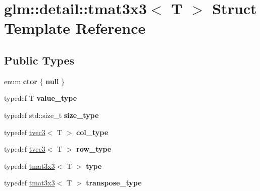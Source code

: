 \hypertarget{structglm_1_1detail_1_1tmat3x3}{}\section{glm\+:\+:detail\+:\+:tmat3x3$<$ T $>$ Struct Template Reference}
\label{structglm_1_1detail_1_1tmat3x3}
\subsection*{Public Types}
\begin{DoxyCompactItemize}
\item 
\hypertarget{structglm_1_1detail_1_1tmat3x3_a24175afa829b47d3cc2a65860b16e103}{}enum {\bfseries ctor} \{ {\bfseries null}
 \}\label{structglm_1_1detail_1_1tmat3x3_a24175afa829b47d3cc2a65860b16e103}

\item 
\hypertarget{structglm_1_1detail_1_1tmat3x3_aab4f85e201efbee89e6da484930a2dc8}{}typedef T {\bfseries value\+\_\+type}\label{structglm_1_1detail_1_1tmat3x3_aab4f85e201efbee89e6da484930a2dc8}

\item 
\hypertarget{structglm_1_1detail_1_1tmat3x3_aba8dbcfaebb2bff81e45ec6a5b405629}{}typedef std\+::size\+\_\+t {\bfseries size\+\_\+type}\label{structglm_1_1detail_1_1tmat3x3_aba8dbcfaebb2bff81e45ec6a5b405629}

\item 
\hypertarget{structglm_1_1detail_1_1tmat3x3_ad0e2472707a4ef5ebdb99d01f265cfd5}{}typedef \hyperlink{structglm_1_1detail_1_1tvec3}{tvec3}$<$ T $>$ {\bfseries col\+\_\+type}\label{structglm_1_1detail_1_1tmat3x3_ad0e2472707a4ef5ebdb99d01f265cfd5}

\item 
\hypertarget{structglm_1_1detail_1_1tmat3x3_a6d6d712e55dac6fa3660ea23923ed62e}{}typedef \hyperlink{structglm_1_1detail_1_1tvec3}{tvec3}$<$ T $>$ {\bfseries row\+\_\+type}\label{structglm_1_1detail_1_1tmat3x3_a6d6d712e55dac6fa3660ea23923ed62e}

\item 
\hypertarget{structglm_1_1detail_1_1tmat3x3_a16d3ade773d7ecdee78f54f9c8b355fd}{}typedef \hyperlink{structglm_1_1detail_1_1tmat3x3}{tmat3x3}$<$ T $>$ {\bfseries type}\label{structglm_1_1detail_1_1tmat3x3_a16d3ade773d7ecdee78f54f9c8b355fd}

\item 
\hypertarget{structglm_1_1detail_1_1tmat3x3_a8297942592cc441994c1a8b55119d6a7}{}typedef \hyperlink{structglm_1_1detail_1_1tmat3x3}{tmat3x3}$<$ T $>$ {\bfseries transpose\+\_\+type}\label{structglm_1_1detail_1_1tmat3x3_a8297942592cc441994c1a8b55119d6a7}

\end{DoxyCompactItemize}
